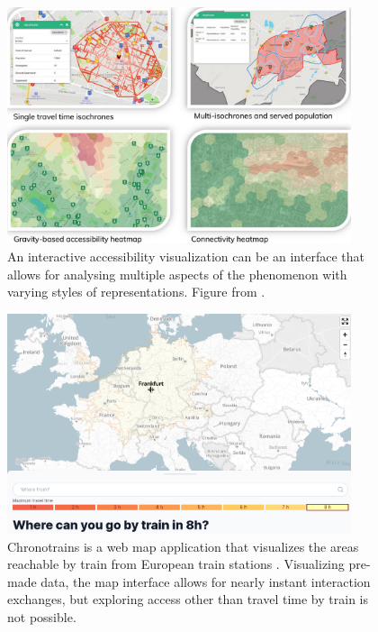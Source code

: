 \begin{figure}[H]
	\centering
	\includegraphics[width=0.9\textwidth]{visual/figures/screenshots/goat}
	\caption{
		An interactive accessibility visualization can be an interface that
		allows for analysing multiple aspects of the phenomenon
		with varying styles of representations.
		Figure from \textcite{paj2022}.
	}
	\label{fig:goat}
\end{figure}

\begin{figure}[H]
	\centering
	\includegraphics[width=0.9\textwidth]{visual/figures/screenshots/chronotrains}
	\caption{
		Chronotrains is a web map application that visualizes
		the areas reachable by train from European train stations \parencite{tra2022}.
		Visualizing pre-made data,
		the map interface allows for nearly instant interaction exchanges,
		but exploring access other than travel time by train is not possible.
	}
	\label{fig:chronotrains}
\end{figure}


